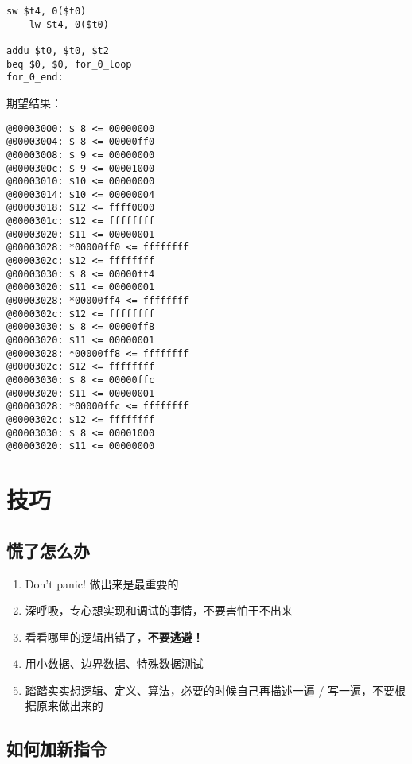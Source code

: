 \documentclass[12pt,AutoFakeBold,AutoFakeSlant]{article}
\providecommand{\tightlist}{%
  \setlength{\itemsep}{0pt}\setlength{\parskip}{0pt}}
\begin{document}
\begin{enumerate}
\begin{lstlisting}[language={[mips]Assembler}]
	sw $t4, 0($t0)
	lw $t4, 0($t0)

addu $t0, $t0, $t2
beq $0, $0, for_0_loop
for_0_end:
\end{lstlisting}
期望结果：
\begin{lstlisting}
@00003000: $ 8 <= 00000000
@00003004: $ 8 <= 00000ff0
@00003008: $ 9 <= 00000000
@0000300c: $ 9 <= 00001000
@00003010: $10 <= 00000000
@00003014: $10 <= 00000004
@00003018: $12 <= ffff0000
@0000301c: $12 <= ffffffff
@00003020: $11 <= 00000001
@00003028: *00000ff0 <= ffffffff
@0000302c: $12 <= ffffffff
@00003030: $ 8 <= 00000ff4
@00003020: $11 <= 00000001
@00003028: *00000ff4 <= ffffffff
@0000302c: $12 <= ffffffff
@00003030: $ 8 <= 00000ff8
@00003020: $11 <= 00000001
@00003028: *00000ff8 <= ffffffff
@0000302c: $12 <= ffffffff
@00003030: $ 8 <= 00000ffc
@00003020: $11 <= 00000001
@00003028: *00000ffc <= ffffffff
@0000302c: $12 <= ffffffff
@00003030: $ 8 <= 00001000
@00003020: $11 <= 00000000
\end{lstlisting}
\end{enumerate}


\hypertarget{ux6280ux5de7}{%
\section{技巧}\label{ux6280ux5de7}}

\hypertarget{ux614cux4e86ux600eux4e48ux529e}{%
\subsection{慌了怎么办}\label{ux614cux4e86ux600eux4e48ux529e}}

\begin{enumerate}
\def\labelenumi{\arabic{enumi}.}
\tightlist
\item
  Don't panic! 做出来是最重要的
\item
  深呼吸，专心想实现和调试的事情，不要害怕干不出来
\item
  看看哪里的逻辑出错了，\textbf{不要逃避！}
\item
  用小数据、边界数据、特殊数据测试
\item
  踏踏实实想逻辑、定义、算法，必要的时候自己再描述一遍 /
  写一遍，不要根据原来做出来的
\end{enumerate}

\hypertarget{ux5982ux4f55ux52a0ux65b0ux6307ux4ee4}{%
\subsection{如何加新指令}\label{ux5982ux4f55ux52a0ux65b0ux6307ux4ee4}}
\end{document}
